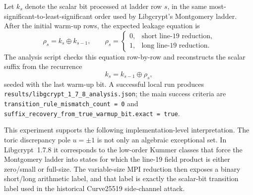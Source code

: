 Let \(k_s\) denote the scalar bit processed at ladder row \(s\), in the same
most-significant-to-least-significant order used by Libgcrypt's Montgomery
ladder.  After the initial warm-up rows, the expected leakage equation is
\[
  \rho_s = k_s \oplus k_{s-1},
  \qquad
  \rho_s =
  \begin{cases}
    0, & \text{short line-19 reduction},\\
    1, & \text{long line-19 reduction}.
  \end{cases}
\]
The analysis script checks this equation row-by-row and reconstructs the scalar
suffix from the recurrence
\[
  k_s = k_{s-1}\oplus\rho_s,
\]
seeded with the last warm-up bit.  A successful local run produces
\texttt{results/libgcrypt\_1\_7\_8\_analysis.json}; the main success criteria are
\texttt{transition\_rule\_mismatch\_count = 0} and
\texttt{suffix\_recovery\_from\_true\_warmup\_bit.exact = true}.

This experiment supports the following implementation-level interpretation.  The
toric discrepancy pole \(u=\pm1\) is not only an algebraic exceptional set.  In
Libgcrypt~1.7.8 it corresponds to the low-order Kummer classes that force the
Montgomery ladder into states for which the line-19 field product is either
zero/small or full-size.  The variable-size MPI reduction then exposes a binary
short/long arithmetic label, and that label is exactly the scalar-bit transition
label used in the historical Curve25519 side-channel attack.
